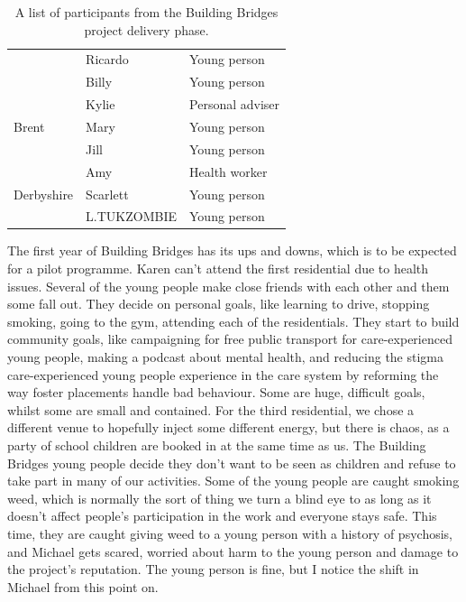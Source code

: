\begin{table}[hbt!]
\begin{tabular}{|l|l|l|}
                               & Ricardo                   & Young person                  \\ \cline{2–3} 
                               & Billy                     & Young person                  \\ \hline
\multirow{3}{*}{Brent}         & Kylie                     & Personal adviser              \\ \cline{2–3} 
                               & Mary                      & Young person                  \\ \cline{2–3} 
                               & Jill                      & Young person                  \\ \hline
\multirow{3}{*}{Derbyshire}    & Amy                       & Health worker                 \\ \cline{2–3} 
                               & Scarlett                  & Young person                  \\ \cline{2–3} 
                               & L.TUKZOMBIE               & Young person                  \\ \hline
\end{tabular}
\caption{A list of participants from the Building Bridges project delivery phase.}
\label{tab:building-bridges-bridges}
\end{table}
The first year of Building Bridges has its ups and downs, which is to be expected for a pilot programme. Karen can't attend the first residential due to health issues. Several of the young people make close friends with each other and them some fall out. They decide on personal goals, like learning to drive, stopping smoking, going to the gym, attending each of the residentials. They start to build community goals, like campaigning for free public transport for care-experienced young people, making a podcast about mental health, and reducing the stigma care-experienced young people experience in the care system by reforming the way foster placements handle bad behaviour. Some are huge, difficult goals, whilst some are small and contained. For the third residential, we chose a different venue to hopefully inject some different energy, but there is chaos, as a party of school children are booked in at the same time as us.  The Building Bridges young people decide they don't want to be seen as children and refuse to take part in many of our activities. Some of the young people are caught smoking weed, which is normally the sort of thing we turn a blind eye to as long as it doesn't affect people's participation in the work and everyone stays safe. This time, they are caught giving weed to a young person with a history of psychosis, and Michael gets scared, worried about harm to the young person and damage to the project's reputation. The young person is fine, but I notice the shift in Michael from this point on.

